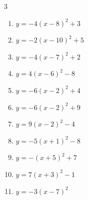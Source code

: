 \begin{multicols}{3}
\begin{enumerate}
        \phantom{$\displaystyle 頂点\left( 8 , 0 \right)$}

  \item $\displaystyle y=-4\left( x-8\right)^{2}+3$

        \phantom{$\displaystyle 頂点\left( 8 , 3 \right)$}

  \item $\displaystyle y=-2\left( x-10\right)^{2}+5$

        \phantom{$\displaystyle 頂点\left( 10 , 5 \right)$}

  \item $\displaystyle y=-4\left( x-7\right)^{2}+2$

        \phantom{$\displaystyle 頂点\left( 7 , 2 \right)$}

  \item $\displaystyle y=4\left( x-6\right)^{2}-8$

        \phantom{$\displaystyle 頂点\left( 6 , -8 \right)$}

  \item $\displaystyle y=-6\left( x-2\right)^{2}+4$

        \phantom{$\displaystyle 頂点\left( 2 , 4 \right)$}

  \item $\displaystyle y=-6\left( x-2\right)^{2}+9$

        \phantom{$\displaystyle 頂点\left( 2 , 9 \right)$}

  \item $\displaystyle y=9\left( x-2\right)^{2}-4$

        \phantom{$\displaystyle 頂点\left( 2 , -4 \right)$}

  \item $\displaystyle y=-5\left( x+1\right)^{2}-8$

        \phantom{$\displaystyle 頂点\left( -1 , -8 \right)$}

\columnbreak %

\resetques

  \item $\displaystyle y=-\left( x+5\right)^{2}+7$

        \phantom{$\displaystyle 頂点\left( -5 , 7 \right)$}

  \item $\displaystyle y=7\left( x+3\right)^{2}-1$

        \phantom{$\displaystyle 頂点\left( -3 , -1 \right)$}

  \item $\displaystyle y=-3\left( x-7\right)^{2}$


\end{enumerate}
\end{multicols}
